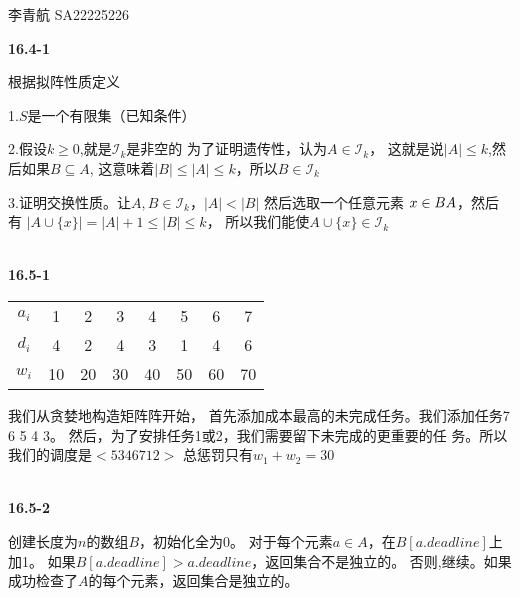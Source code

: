\documentclass[UTF8]{ctexart}
\begin{document}
    李青航 SA22225226

    \noindent\textbf{16.4-1 }

    根据拟阵性质定义

    1.$S$是一个有限集（已知条件）

    2.假设$k\ge 0$,就是$\mathcal{I}_k$是非空的
    为了证明遗传性，认为$A \in \mathcal{I}_k$，
    这就是说$|A|\le k$,然后如果$B\subseteq A$,
    这意味着$|B|\le |A|\le k$，所以$B\in \mathcal{I}_k$

    3.证明交换性质。让$A,B\in \mathcal{I}_k$，$|A|<|B|$
    然后选取一个任意元素 $x\in B\\A$，然后有
    $|A\cup\{x\}|=|A|+1\le |B|\le k$，
    所以我们能使$A\cup \{x\}\in \mathcal{I}_k$

    ~\\
    \noindent\textbf{16.5-1}

    
\begin{table}[h]
    \centering
    \begin{tabular}{cccccccc} 
    \toprule
    $a_i$ & 1  & 2  & 3  & 4  & 5  & 6  & 7   \\
    $d_i$ & 4  & 2  & 4  & 3  & 1  & 4  & 6   \\
    $w_i$ & 10 & 20 & 30 & 40 & 50 & 60 & 70  \\
    \bottomrule
    \end{tabular}
    \end{table}

    我们从贪婪地构造矩阵阵开始，
    首先添加成本最高的未完成任务。我们添加任务7 6 5 4 3。
    然后，为了安排任务1或2，我们需要留下未完成的更重要的任
    务。所以我们的调度是$<5 3 4 6 7 1 2>$
    总惩罚只有$w_1+w_2 = 30$

    ~\\
    \noindent\textbf{16.5-2}

    创建长度为$n$的数组$B$，初始化全为0。
    对于每个元素$a\in A$，在$B[a.deadline]$上加1。
    如果$B[a.deadline] > a.deadline$，返回集合不是独立的。
    否则,继续。如果成功检查了$A$的每个元素，返回集合是独立的。
\end{document}
